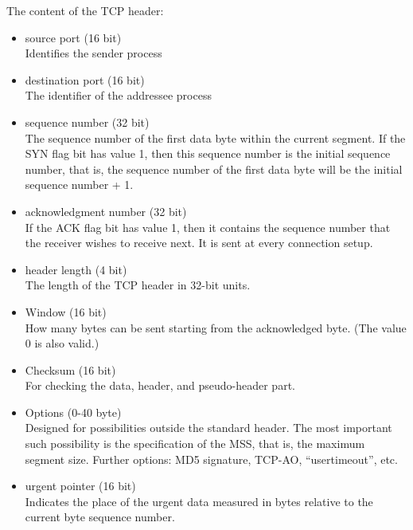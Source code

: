 \documentclass[margin=0px]{article}
\begin{document}
\begin{description}
\begin{itemize}
\begin{itemize}
                  \end{itemize}
                  The content of the TCP header:
                  \begin{itemize}
                      \item source port (16 bit)\\
                            Identifies the sender process
                      \item destination port (16 bit)\\
                            The identifier of the addressee process
                      \item sequence number (32 bit)\\
                            The sequence number of the first data byte within the current segment. If the SYN flag bit has value 1, then this sequence number is the initial sequence number, that is, the sequence number of the first data byte will be the initial sequence number + 1.
                      \item acknowledgment number (32 bit)\\
                            If the ACK flag bit has value 1, then it contains the sequence number that the receiver wishes to receive next. It is sent at every connection setup.
                      \item header length (4 bit)\\
                            The length of the TCP header in 32-bit units.
                      \item Window (16 bit)\\
                            How many bytes can be sent starting from the acknowledged byte. (The value 0 is also valid.)
                      \item Checksum (16 bit)\\
                            For checking the data, header, and pseudo-header part.
                      \item Options (0-40 byte)\\
                            Designed for possibilities outside the standard header. The most important such possibility is the specification of the MSS, that is, the maximum segment size. Further options: MD5 signature, TCP-AO, ``usertimeout'', etc.
                      \item urgent pointer (16 bit) \\
                            Indicates the place of the urgent data measured in bytes relative to the current byte sequence number.

\end{itemize}
\end{itemize}
\end{description}
\end{document}
